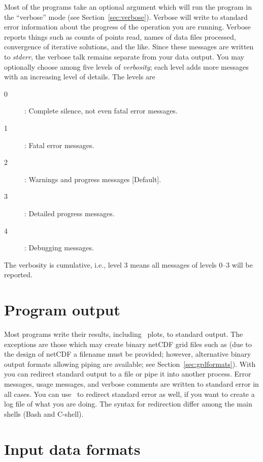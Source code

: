 Most of the programs take an optional  argument
which will run the program in the ``verbose'' mode (see Section~\ref{sec:verbose}).
Verbose will write to standard error information about the progress
of the operation you are running.  Verbose reports things
such as counts of points read, names of data files
processed, convergence of iterative solutions, and the like.
Since these messages are written to \emph{stderr},  the
verbose talk remains separate from your data output. 
You may optionally choose among five levels of \emph{verbosity}; each level
adds more messages with an increasing level of details.  The levels are
\begin{description}
	\item [0]: Complete silence, not even fatal error messages.
	\item [1]: Fatal error messages.
	\item [2]: Warnings and progress messages [Default].
	\item [3]: Detailed progress messages.
	\item [4]: Debugging messages.
\end{description}
The verbosity is cumulative, i.e., level 3 means all messages of levels 0--3
will be reported.

\section{Program output}

Most programs write their results, including \PS\
plots, to standard output.  The exceptions are those which may
create binary netCDF grid files such as  (due to
the design of netCDF a filename must be provided; however,
alternative binary output formats allowing piping are available; see Section~\ref{sec:grdformats}).
With \UNIX\, you can redirect standard output to a file or pipe it
into another process.  Error messages, usage messages, and
verbose comments are written to standard error in all cases.
You can use \UNIX\ to redirect standard error as well,
if you want to create a log file of what you are doing.
The syntax for redirection differ among the main shells (Bash and C-shell).

\section{Input data formats}
\label{sec:input data}

